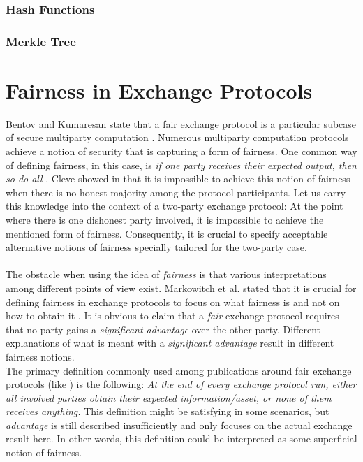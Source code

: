 \documentclass{cacthesis}
\newcounter{protocol}
\begin{document}
        \subsection{Hash Functions}
        \subsection{Merkle Tree}

    \chapter{Fairness in Exchange Protocols}
        Bentov and Kumaresan state that a fair exchange protocol is a particular subcase of secure multiparty computation \cite{10.1007/978-3-662-44381-1_24}. Numerous multiparty computation protocols achieve a notion of security that is capturing a form of fairness. One common way of defining fairness, in this case, is \textit{if one party receives their expected output, then so do all} \cite{10.1007/978-3-540-79263-5_8}. Cleve showed in \cite{10.1145/12130.12168} that it is impossible to achieve this notion of fairness when there is no honest majority among the protocol participants. Let us carry this knowledge into the context of a two-party exchange protocol: At the point where there is one dishonest party involved, it is impossible to achieve the mentioned form of fairness. Consequently, it is crucial to specify acceptable alternative notions of fairness specially tailored for the two-party case.   \\\\
        The obstacle when using the idea of \textit{fairness} is that various interpretations among different points of view exist. Markowitch et al. stated that it is crucial for defining fairness in exchange protocols to focus on what fairness is and not on how to obtain it \cite{10.1007/3-540-36552-4_31}. It is obvious to claim that a \textit{fair} exchange protocol requires that no party gains a \textit{significant advantage} over the other party. Different explanations of what is meant with a \textit{significant advantage} result in different fairness notions. \\
        The primary definition commonly used among publications around fair exchange protocols (like \cite{10.1145/266420.266426} \cite{asyncOptiFairEx1998} \cite{remarksOnFairEx2000})  is the following: \textit{At the end of every exchange protocol run, either all involved parties obtain their expected information/asset, or none of them receives anything.} This definition might be satisfying in some scenarios, but \textit{advantage} is still described insufficiently and only focuses on the actual exchange result here. In other words, this definition could be interpreted as some superficial notion of fairness. \\\\
\end{document}
